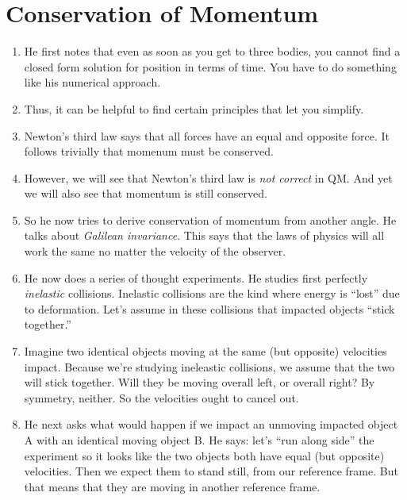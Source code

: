 \section{Conservation of Momentum}

\begin{enumerate}

  \item He first notes that even as soon as you get to three bodies, you
  cannot find a closed form solution for position in terms of time. You
  have to do something like his numerical approach.

  \item Thus, it can be helpful to find certain principles that let you
  simplify.

  \item Newton's third law says that all forces have an equal and
  opposite force. It follows trivially that momenum must be conserved.

  \item However, we will see that Newton's third law is \emph{not
  correct} in QM. And yet we will also see that momentum is still
  conserved.

  \item So he now tries to derive conservation of momentum from another
  angle. He talks about \emph{Galilean invariance}. This says that the
  laws of physics will all work the same no matter the velocity of the
  observer.

  \item He now does a series of thought experiments. He studies first
  perfectly \emph{inelastic} collisions. Inelastic collisions are the
  kind where energy is ``lost'' due to deformation. Let's assume in
  these collisions that impacted objects ``stick together.''

  \item Imagine two identical objects moving at the same (but opposite)
  velocities impact. Because we're studying ineleastic collisions, we
  assume that the two will stick together. Will they be moving overall
  left, or overall right? By symmetry, neither. So the velocities ought
  to cancel out.

  \item He next asks what would happen if we impact an unmoving impacted
  object A with an identical moving object B. He says: let's ``run along
  side'' the experiment so it looks like the two objects both have equal
  (but opposite) velocities. Then we expect them to stand still, from
  our reference frame. But that means that they are moving in another
  reference frame.


\end{enumerate}
